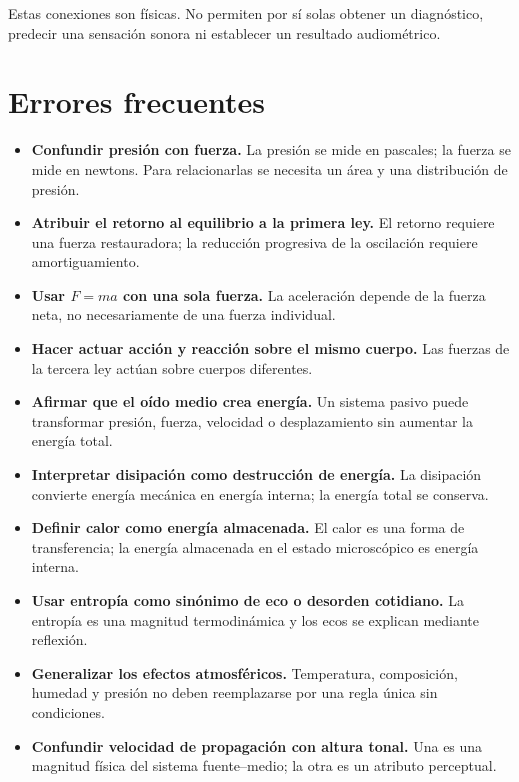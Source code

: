 Estas conexiones son físicas. No permiten por sí solas obtener un diagnóstico, predecir una sensación sonora ni establecer un resultado audiométrico.

\section{Errores frecuentes}
\label{sec:u2-errores}

\begin{itemize}
    \item \textbf{Confundir presión con fuerza.} La presión se mide en pascales; la fuerza se mide en newtons. Para relacionarlas se necesita un área y una distribución de presión.
    \item \textbf{Atribuir el retorno al equilibrio a la primera ley.} El retorno requiere una fuerza restauradora; la reducción progresiva de la oscilación requiere amortiguamiento.
    \item \textbf{Usar \(F=ma\) con una sola fuerza.} La aceleración depende de la fuerza neta, no necesariamente de una fuerza individual.
    \item \textbf{Hacer actuar acción y reacción sobre el mismo cuerpo.} Las fuerzas de la tercera ley actúan sobre cuerpos diferentes.
    \item \textbf{Afirmar que el oído medio crea energía.} Un sistema pasivo puede transformar presión, fuerza, velocidad o desplazamiento sin aumentar la energía total.
    \item \textbf{Interpretar disipación como destrucción de energía.} La disipación convierte energía mecánica en energía interna; la energía total se conserva.
    \item \textbf{Definir calor como energía almacenada.} El calor es una forma de transferencia; la energía almacenada en el estado microscópico es energía interna.
    \item \textbf{Usar entropía como sinónimo de eco o desorden cotidiano.} La entropía es una magnitud termodinámica y los ecos se explican mediante reflexión.
    \item \textbf{Generalizar los efectos atmosféricos.} Temperatura, composición, humedad y presión no deben reemplazarse por una regla única sin condiciones.
    \item \textbf{Confundir velocidad de propagación con altura tonal.} Una es una magnitud física del sistema fuente--medio; la otra es un atributo perceptual.
\end{itemize}

